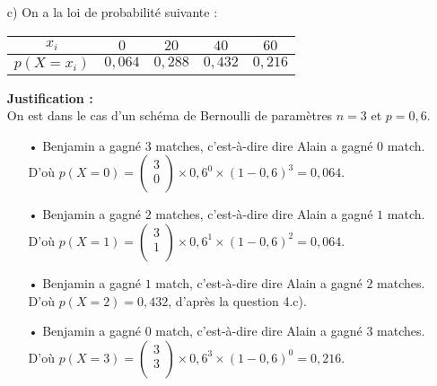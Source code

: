 \begin{itemize}
\begin{itemize}
\item[c)] On a la loi de probabilité suivante : \\

\begin{tabular}{c|c|c|c|c}
$x_i$ & $0$ & $20$ & $40$ & $60$ \\
\hline
$p\left(X = x_i\right)$ & $0,064$ & $0,288$ & $0,432$ & $0,216$ \\
\end{tabular}

\vspace*{.3cm}

\textbf{Justification :} \\

On est dans le cas d'un schéma de Bernoulli de paramètres $ n =3$ et $p = 0,6$. \\

\begin{itemize}
\item[•] Benjamin a gagné $3$ matches, c'est-à-dire dire Alain a gagné $0$ match. \\

D'où $p\left(X = 0\right) = \begin{pmatrix}
3 \\
0 \\
\end{pmatrix} \times 0,6^0 \times \left(1 - 0,6\right)^3 = 0,064$. \\

\item[•] Benjamin a gagné $2$ matches, c'est-à-dire dire Alain a gagné $1$ match. \\

D'où $p\left(X = 1\right) = \begin{pmatrix}
3 \\
1 \\
\end{pmatrix} \times 0,6^1 \times \left(1 - 0,6\right)^2 = 0,064$. \\

\item[•] Benjamin a gagné $1$ match, c'est-à-dire dire Alain a gagné $2$ matches. D'où $p\left(X = 2\right) = 0,432$, d'après la question 4.c). \\

\item[•] Benjamin a gagné $0$ match, c'est-à-dire dire Alain a gagné $3$ matches. \\

D'où $p\left(X = 3\right) = \begin{pmatrix}
3 \\
3 \\
\end{pmatrix} \times 0,6^3 \times \left(1 - 0,6\right)^0 = 0,216$. \\


\end{itemize}
\end{itemize}
\end{itemize}
